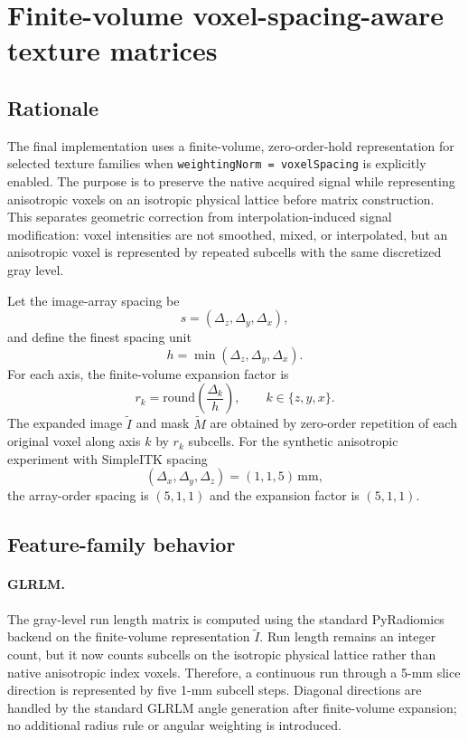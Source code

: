 \section{Finite-volume voxel-spacing-aware texture matrices}

\subsection{Rationale}

The final implementation uses a finite-volume, zero-order-hold representation for selected texture families when
\texttt{weightingNorm = voxelSpacing} is explicitly enabled. The purpose is to preserve the native acquired signal
while representing anisotropic voxels on an isotropic physical lattice before matrix construction. This separates
geometric correction from interpolation-induced signal modification: voxel intensities are not smoothed, mixed, or
interpolated, but an anisotropic voxel is represented by repeated subcells with the same discretized gray level.

Let the image-array spacing be
\[
s = (\Delta_z,\Delta_y,\Delta_x),
\]
and define the finest spacing unit
\[
h = \min(\Delta_z,\Delta_y,\Delta_x).
\]
For each axis, the finite-volume expansion factor is
\[
r_k = \mathrm{round}\left(\frac{\Delta_k}{h}\right), \qquad k \in \{z,y,x\}.
\]
The expanded image $\tilde I$ and mask $\tilde M$ are obtained by zero-order repetition of each original voxel along
axis $k$ by $r_k$ subcells. For the synthetic anisotropic experiment with SimpleITK spacing
\[
(\Delta_x,\Delta_y,\Delta_z)=(1,1,5)\,\mathrm{mm},
\]
the array-order spacing is $(5,1,1)$ and the expansion factor is $(5,1,1)$.

\subsection{Feature-family behavior}

\paragraph{GLRLM.}
The gray-level run length matrix is computed using the standard PyRadiomics backend on the finite-volume
representation $\tilde I$. Run length remains an integer count, but it now counts subcells on the isotropic physical
lattice rather than native anisotropic index voxels. Therefore, a continuous run through a 5-mm slice direction is
represented by five 1-mm subcell steps. Diagonal directions are handled by the standard GLRLM angle generation after
finite-volume expansion; no additional radius rule or angular weighting is introduced.

